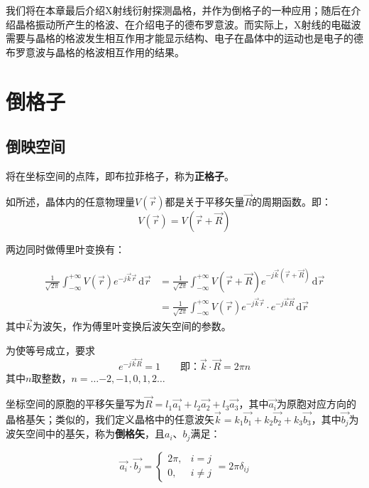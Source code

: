     我们将在本章最后介绍X射线衍射探测晶格，并作为倒格子的一种应用；随后在介绍晶格振动所产生的格波、在介绍电子的德布罗意波。而实际上，X射线的电磁波需要与晶格的格波发生相互作用才能显示结构、电子在晶体中的运动也是电子的德布罗意波与晶格的格波相互作用的结果。
    
\section{倒格子}
\subsection{倒映空间}
    将在坐标空间的点阵，即布拉菲格子，称为\textbf{正格子}。

    如所述，晶体内的任意物理量$V(\vec{r})$都是关于平移矢量$\vec{R}$的周期函数。即：
    \begin{equation}
        V(\vec{r})=V(\vec{r}+\vec{R})
    \end{equation}

    两边同时做傅里叶变换有：

    \begin{equation}
    \begin{aligned}
        \frac{1}{\sqrt{2\pi}}\int_{-\infty}^{+\infty} V(\vec{r})e^{-j\vec{k}\vec{r}} \,\mathrm{d}\vec{r}&=\frac{1}{\sqrt{2\pi}}\int_{-\infty}^{+\infty} V(\vec{r}+\vec{R})e^{-j\vec{k}(\vec{r}+\vec{R})} \,\mathrm{d}\vec{r}\\
        &=\frac{1}{\sqrt{2\pi}}\int_{-\infty}^{+\infty} V(\vec{r})e^{-j\vec{k}\vec{r}}\cdot e^{-j\vec{k}\vec{R}} \,\mathrm{d}\vec{r}
    \end{aligned}
    \end{equation}
    其中$\vec{k}$为波矢，作为傅里叶变换后波矢空间的参数。

    为使等号成立，要求
    \begin{equation}
        e^{-j\vec{k}\vec{R}}=1\qquad\mbox{即：}\vec{k}\cdot\vec{R}=2\pi n
    \end{equation}
    其中$n$取整数，$n=\dots{-2},-1,0,1,2\dots$

    坐标空间的原胞的平移矢量写为$\vec{R}=l_1\vec{a_1}+l_2\vec{a_2}+l_3\vec{a_3}$，其中$\vec{a_i}$为原胞对应方向的晶格基矢；类似的，我们定义晶格中的任意波矢$\vec{k}=k_1\vec{b_1}+k_2\vec{b_2}+k_3\vec{b_3}$，其中$\vec{b_j}$为波矢空间中的基矢，称为\textbf{倒格矢}，且$a_i$、$b_j$满足：

    \begin{equation}\label{eq:2.6}
        \vec{a_i}\cdot\vec{b_j}=
        \begin{cases}
            2\pi,&i=j\\
            0,&i\neq j
        \end{cases}
        =2\pi\delta_{ij}
    \end{equation}

